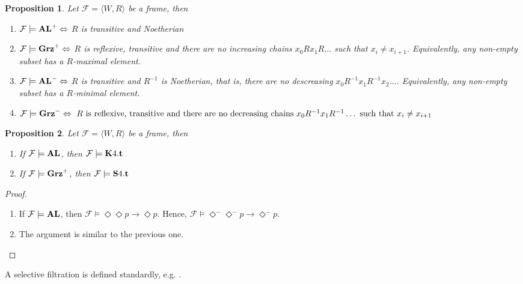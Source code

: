 \documentclass[a4paper]{article}
\theoremstyle{defin}
\theoremstyle{theorem}
\theoremstyle{prop}
\newtheorem{prop}{Proposition}
\theoremstyle{lemma}
\theoremstyle{ex}
\theoremstyle{col}
\newcommand{\DiamondM}{\Diamond^{-}}
\begin{document}
\begin{prop} Let $\mathcal{F} = \langle W, R \rangle$ be a frame, then

  \begin{enumerate}
    \item $\mathcal{F} \models {\bf AL}^{+} \Leftrightarrow$ $R$ is transitive and Noetherian
    \item $\mathcal{F} \models {\bf Grz}^{+} \Leftrightarrow$ $R$ is reflexive, transitive and there are no increasing chains $x_0 R x_1 R \dots$ such that $x_i \neq x_{i + 1}$. Equivalently, any non-empty subset has a $R$-maximal element.
    \item $\mathcal{F} \models {\bf AL}^{-} \Leftrightarrow$ $R$ is transitive and $R^{-1}$ is Noetherian, that is, there are no descreasing  $x_0 R^{-1} x_1 R^{-1} x_2 \dots$. Equivalently, any non-empty subset has a $R$-minimal element.
    \item $\mathcal{F} \models {\bf Grz}^{-} \Leftrightarrow \text{ $R$ is reflexive, transitive and there are no decreasing chains $x_0 R^{-1} x_1 R^{-1} \dots$ such that $x_i \neq x_{i + 1}$}$
  \end{enumerate}
\end{prop}

\begin{prop} Let $\mathcal{F} = \langle W, R \rangle$ be a frame, then

  \begin{enumerate}
  \item If $\mathcal{F} \models {\bf AL}$, then $\mathcal{F} \models {\bf K}4.{\bf t}$
  \item If $\mathcal{F} \models {\bf Grz}^{+}$, then $\mathcal{F} \models {\bf S}4.{\bf t}$
\end{enumerate}
\end{prop}

\begin{proof}
  $ $

  \begin{enumerate}
    \item If $\mathcal{F} \models {\bf AL}$, then $\mathcal{F} \models \Diamond \Diamond p \to \Diamond p$. Hence, $\mathcal{F} \models \DiamondM \DiamondM p \to \DiamondM p$.
    \item The argument is similar to the previous one.
  \end{enumerate}
\end{proof}

A selective filtration is defined standardly, e.g. \cite{ShapirovskyS02}.
\end{document}
